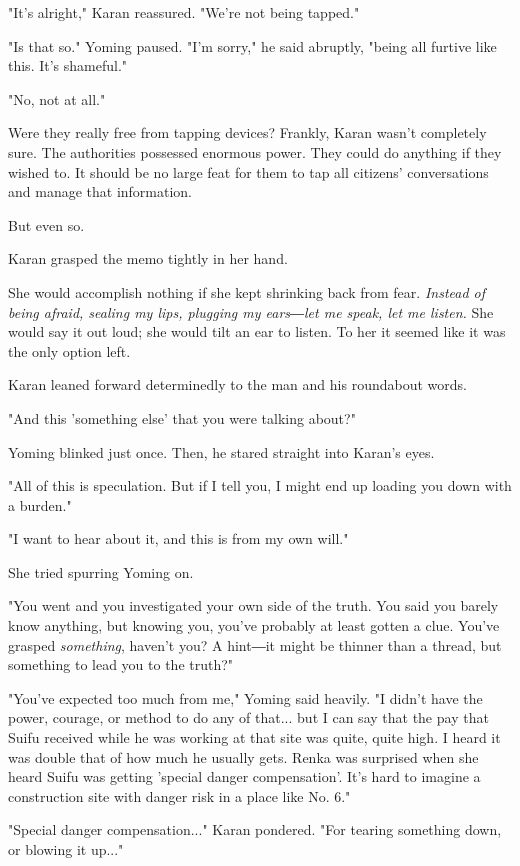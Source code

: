 "It's alright," Karan reassured. "We're not being tapped."

"Is that so." Yoming paused. "I'm sorry," he said abruptly, "being all
furtive like this. It's shameful."

"No, not at all."

Were they really free from tapping devices? Frankly, Karan wasn't
completely sure. The authorities possessed enormous power. They could do
anything if they wished to. It should be no large feat for them to tap
all citizens' conversations and manage that information.

But even so.

Karan grasped the memo tightly in her hand.

She would accomplish nothing if she kept shrinking back from fear.
\emph{Instead of being afraid, sealing my lips, plugging my ears―let me speak,
let me listen.} She would say it out loud; she would tilt an ear to
listen. To her it seemed like it was the only option left.

Karan leaned forward determinedly to the man and his roundabout words.

"And this 'something else' that you were talking about?"

Yoming blinked just once. Then, he stared straight into Karan's eyes.

"All of this is speculation. But if I tell you, I might end up loading
you down with a burden."

"I want to hear about it, and this is from my own will."

She tried spurring Yoming on.

"You went and you investigated your own side of the truth. You said you
barely know anything, but knowing you, you've probably at least gotten a
clue. You've grasped \emph{something}, haven't you? A hint―it might be thinner
than a thread, but something to lead you to the truth?"

"You've expected too much from me," Yoming said heavily. "I didn't have
the power, courage, or method to do any of that... but I can say that
the pay that Suifu received while he was working at that site was quite,
quite high. I heard it was double that of how much he usually gets.
Renka was surprised when she heard Suifu was getting 'special danger
compensation'. It's hard to imagine a construction site with danger risk
in a place like No. 6."

"Special danger compensation..." Karan pondered. "For tearing something
down, or blowing it up..."

